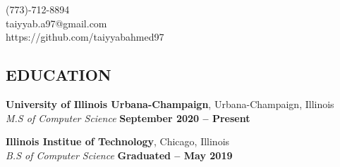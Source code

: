 \documentclass[margin,line]{resume}
\begin{document}
{
    \hfill (773)-712-8894       \vspace{0mm}\\\vspace{0mm}%
    \hfill taiyyab.a97@gmail.com           \vspace{0mm}\\\vspace{0mm}%
    \hfill https://github.com/taiyyabahmed97 \vspace{0mm}\\\vspace{-9mm}%
}

\begin{resume}

    \vspace{-3mm}


    \vspace{-1mm}



    \section{\mysidestyle \textbf{\large{E}\small{DUCATION}}}

    \textbf{\listing University of Illinois Urbana-Champaign}, Urbana-Champaign, Illinois \vspace{1mm}\\
    \textsl{M.S of Computer Science} \hfill \textbf{September 2020 -- Present}\vspace{-3mm}\\\vspace{-1mm}%

    \textbf{\listing Illinois Institue of Technology}, Chicago, Illinois \vspace{1mm}\\
    \textsl{B.S of Computer Science}  \hfill \textbf{Graduated -- May 2019}\vspace{-3mm}\\\vspace{-1mm}%

    \vspace{-1mm}

\sectionline



\end{resume}
\end{document}
